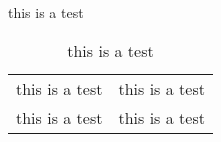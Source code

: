 \documentclass{article}
\begin{document}
	
	this is a test 
	
	\begin{longtable}{cc}
		\caption{this is a test} \\
		this is a test & this is a test \\
		this is a test & this is a test \\ 
	\end{longtable}
	
\end{document}
